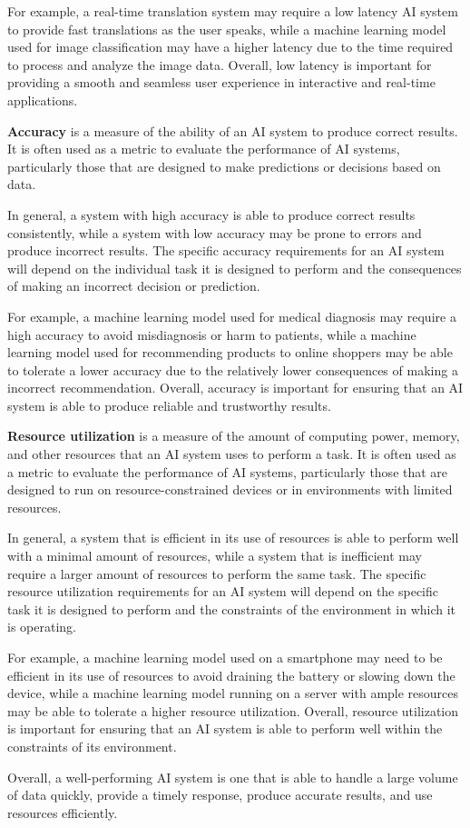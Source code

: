 For example, a real-time translation system may require a low latency AI system to provide fast 
translations as the user speaks, while a machine learning model used for image classification may 
have a higher latency due to the time required to process and analyze the image data. Overall, low 
latency is important for providing a smooth and seamless user experience in interactive and real-time applications.

\textbf{Accuracy} is a measure of the ability of an AI system to produce correct results.
It is often used as a metric to evaluate the performance of AI systems, particularly
those that are designed to make predictions or decisions based on data.

In general, a system with high accuracy is able to produce correct results consistently,
while a system with low accuracy may be prone to errors and produce incorrect results.
The specific accuracy requirements for an AI system will depend on the individual task it is
designed to perform and the consequences of making an incorrect decision or prediction.

For example, a machine learning model used for medical diagnosis may require a
high accuracy to avoid misdiagnosis or harm to patients, while a machine learning model
used for recommending products to online shoppers may be able to tolerate a lower accuracy due to
the relatively lower consequences of making a incorrect recommendation. Overall, accuracy is important for 
ensuring that an AI system is able to produce reliable and trustworthy results.

\textbf{Resource utilization} is a measure of the amount of computing power, memory, and other 
resources that an AI system uses to perform a task.
It is often used as a metric to evaluate the performance of AI systems, particularly those that 
are designed to run on resource-constrained devices or in environments with limited resources.

In general, a system that is efficient in its use of resources is able to perform well with a 
minimal amount of resources, while a system that is inefficient may require a larger amount of 
resources to perform the same task. The specific resource utilization requirements for an AI system 
will depend on the specific task it is designed to perform and the constraints of the environment 
in which it is operating.

For example, a machine learning model used on a smartphone may need to be efficient in its use of 
resources to avoid draining the battery or slowing down the device, while a machine learning model 
running on a server with ample resources may be able to tolerate a higher resource utilization. 
Overall, resource utilization is important for ensuring that an AI system is able to perform well within 
the constraints of its environment.

Overall, a well-performing AI system is one that is able to handle a 
large volume of data quickly, provide a timely response, produce accurate 
results, and use resources efficiently.

